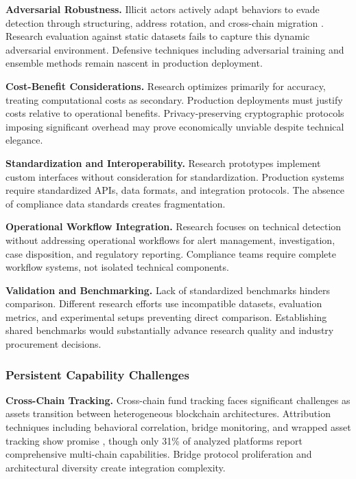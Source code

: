 \documentclass[conference,compsoc]{IEEEtran}
\begin{document}
\noindent\textbf{Adversarial Robustness.} 
Illicit actors actively adapt behaviors to evade detection through structuring, address rotation, and cross-chain migration \cite{albrecht2019usecryptocurrenciesmoney,guidara2022cryptocurrencymoneylaundering,wu2021detectingmixingservices}. Research evaluation against static datasets fails to capture this dynamic adversarial environment. Defensive techniques including adversarial training and ensemble methods remain nascent in production deployment.

\noindent\textbf{Cost-Benefit Considerations.} 
Research optimizes primarily for accuracy, treating computational costs as secondary. Production deployments must justify costs relative to operational benefits. Privacy-preserving cryptographic protocols imposing significant overhead may prove economically unviable despite technical elegance.

\noindent\textbf{Standardization and Interoperability.} 
Research prototypes implement custom interfaces without consideration for standardization. Production systems require standardized APIs, data formats, and integration protocols. The absence of compliance data standards creates fragmentation.

\noindent\textbf{Operational Workflow Integration.} 
Research focuses on technical detection without addressing operational workflows for alert management, investigation, case disposition, and regulatory reporting. Compliance teams require complete workflow systems, not isolated technical components.

\noindent\textbf{Validation and Benchmarking.} 
Lack of standardized benchmarks hinders comparison. Different research efforts use incompatible datasets, evaluation metrics, and experimental setups preventing direct comparison. Establishing shared benchmarks would substantially advance research quality and industry procurement decisions.

\subsubsection{Persistent Capability Challenges}

\noindent\textbf{Cross-Chain Tracking.} 
Cross-chain fund tracking faces significant challenges as assets transition between heterogeneous blockchain architectures. Attribution techniques including behavioral correlation, bridge monitoring, and wrapped asset tracking show promise \cite{yousaf2019tracingtransactionscryptocurrency,zamyatin2021sokcommunicationdistributed,zhang2024securitycrosschainbridges,li2025blockchaincrosschainbridge,lin2024crosschainabnormaltransaction}, though only 31\% of analyzed platforms report comprehensive multi-chain capabilities. Bridge protocol proliferation and architectural diversity create integration complexity.
\end{document}
